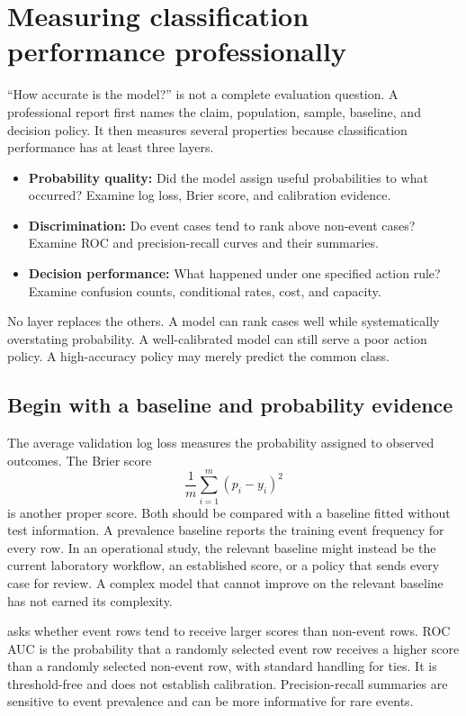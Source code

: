 \section{Measuring classification performance professionally}

``How accurate is the model?'' is not a complete evaluation question. A
professional report first names the claim, population, sample, baseline, and
decision policy. It then measures several properties because classification
performance has at least three layers.

\begin{itemize}
  \item \textbf{Probability quality:} Did the model assign useful probabilities
  to what occurred? Examine log loss, Brier score, and calibration evidence.
  \item \textbf{Discrimination:} Do event cases tend to rank above non-event
  cases? Examine ROC and precision-recall curves and their summaries.
  \item \textbf{Decision performance:} What happened under one specified action
  rule? Examine confusion counts, conditional rates, cost, and capacity.
\end{itemize}

No layer replaces the others. A model can rank cases well while systematically
overstating probability. A well-calibrated model can still serve a poor action
policy. A high-accuracy policy may merely predict the common class.

\subsection{Begin with a baseline and probability evidence}

The average validation log loss measures the probability assigned to observed
outcomes. The Brier score
\[
\frac1m\sum_{i=1}^m(p_i-y_i)^2
\]
is another proper score. Both should be compared with a baseline fitted without
test information. A prevalence baseline reports the training event frequency
for every row. In an operational study, the relevant baseline might instead be
the current laboratory workflow, an established score, or a policy that sends
every case for review. A complex model that cannot improve on the relevant
baseline has not earned its complexity.

 asks whether event rows tend to receive larger scores
than non-event rows. ROC AUC is the probability that a randomly selected event
row receives a higher score than a randomly selected non-event row, with
standard handling for ties. It is threshold-free and does not establish
calibration. Precision-recall summaries are sensitive to event prevalence and
can be more informative for rare events.

